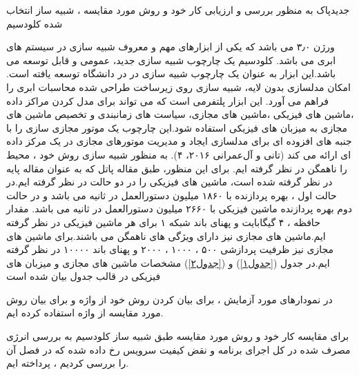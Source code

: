 ‌جدید‌پاک
  به منظور بررسی و ارزیابی کار خود و روش مورد مقایسه ، شبیه ساز انتخاب شده کلودسیم

   ورژن
۳٫۰
         می باشد که یکی از ابزارهای مهم و معروف شبیه سازی در سیستم های ابری می باشد. کلودسیم یک چارچوب شبیه سازی جدید، عمومی و قابل توسعه می باشد.این ابزار به عنوان یک چارچوب شبیه سازی در در دانشگاه 
         توسعه یافته است. امکان مدلسازی بدون لایه، شبیه سازی روی زیرساخت طراحی شده محاسبات ابری را فراهم می آورد. این ابزار پلتفرمی است که می تواند برای مدل کردن مراکز داده ،ماشین های فیزیکی ،ماشین های مجازی،  سیاست های زمانبندی و تخصیص ماشین های مجازی به میزبان های فیزیکی استفاده شود.این چارچوب یک موتور مجازی سازی را با جنبه های افزوده ای برای مدلسازی ایجاد و مدیریت موتورهای مجازی در یک مرکز داده ای ارائه می کند (تانی و آل‌عمرانی ۲۰۱۶، ۴).
         به منظور شبیه سازی روش خود ، محیط را ناهمگن در نظر گرفته ایم. برای این منظور، طبق مقاله پاتل
          که به عنوان مقاله پایه در نظر گرفته شده است، ماشین های فیزیکی را در  دو حالت در نظر گرفته ایم.در حالت اول ، بهره پردازنده با
           ۱۸۶۰ 
          میلیون دستورالعمل در ثانیه
            می باشد و در حالت دوم بهره پردازنده ماشین فیزیکی با 
          ۲۶۶۰ 
          میلیون دستورالعمل در ثانیه می باشد. مقدار حافظه
            ،
             ۴
           گیگابایت و پهنای باند شبکه 
           ۱
           برای هر ماشین فیزیکی در نظر گرفته ایم.ماشین های مجازی نیز دارای ویژگی های ناهمگن می باشند.برای ماشین های مجازی نیز ظرفیت پردازشی
            ۵۰۰
             ، 
             ۱۰۰۰
             ، 
             ۲۰۰۰ 
           و پهنای باند
            ۱۰۰۰۰ 
           در نظر گرفته ایم.در جدول 
(\ref{جدول۱})
            و
(\ref{جدول۲})
              مشخصات ماشین های مجازی و میزبان های فیزیکی در قالب جدول بیان شده است
           \newpage
 
 
در نمودارهای مورد آزمایش ، برای بیان کردن روش خود از واژه
و برای بیان روش مورد مقایسه از واژه
استفاده کرده ایم. 

برای مقایسه کار خود و روش مورد مقایسه طبق شبیه ساز کلودسیم به بررسی انرژی مصرف شده در کل اجرای برنامه و نقض کیفیت سرویس رخ داده شده که در فصل
 آن را بررسی کردیم ، پرداخته ایم.

